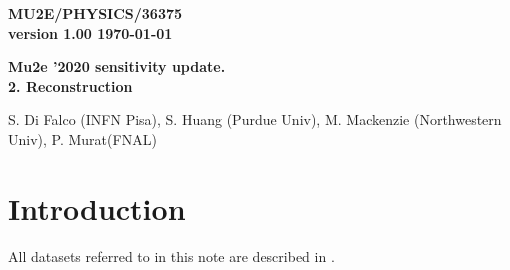 \documentclass[12pt]{article}
\begin{document}
\begin{titlepage}
  \begin{flushright}
    \bf {MU2E/PHYSICS/36375} \\
    version 1.00
    \today
 \end{flushright}

  \vspace{1cm}
  
  \begin{center}
    {\Large \bf Mu2e '2020 sensitivity update. \\
      2. Reconstruction} 
    
    \vspace{1cm}
    
    S. Di Falco (INFN Pisa), S. Huang (Purdue Univ), M. Mackenzie (Northwestern Univ), P. Murat(FNAL)
    
    \vspace{0.3cm}
    
    \vspace{0.8cm}                           
  \end{center}

  \begin{abstract}
    The note documents changes made to the Mu2e reconstruction software used for '2020 sensitivity update (SU2020)
  \end{abstract}

\end{titlepage}
%
%
%
{\tableofcontents}

% 


\newpage
\section { Introduction}
All datasets referred to in this note are described in \cite{MU2E_36372_SU2020_DATASETS}.










\end{document}
